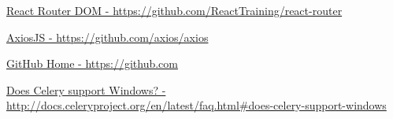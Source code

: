 \begin{thebibliography}{9}
    \href{https://github.com/ReactTraining/react-router}{React Router DOM - https://github.com/ReactTraining/react-router}

    \href{https://github.com/axios/axios}{AxiosJS - https://github.com/axios/axios}

    \href{https://github.com}{GitHub Home - https://github.com}

    \href{http://docs.celeryproject.org/en/latest/faq.html#does-celery-support-windows}
    {Does Celery support Windows? - http://docs.celeryproject.org/en/latest/faq.html\#does-celery-support-windows}

\end{thebibliography}